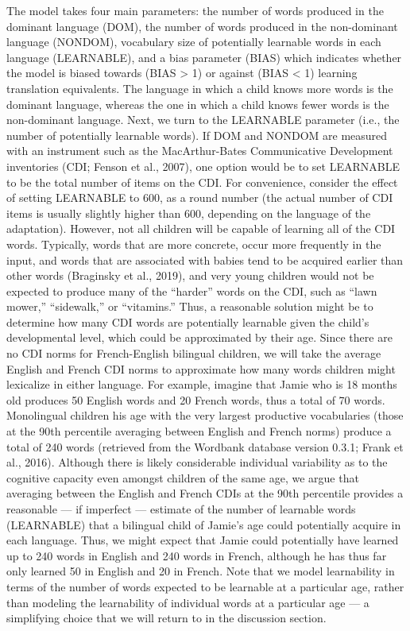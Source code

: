 \documentclass[
  english,
  ,man,floatsintext]{apa6}
\begin{document}
The model takes four main parameters: the number of words produced in the dominant language (DOM), the number of words produced in the non-dominant language (NONDOM), vocabulary size of potentially learnable words in each language (LEARNABLE), and a bias parameter (BIAS) which indicates whether the model is biased towards (BIAS \textgreater{} 1) or against (BIAS \textless{} 1) learning translation equivalents. The language in which a child knows more words is the dominant language, whereas the one in which a child knows fewer words is the non-dominant language. Next, we turn to the LEARNABLE parameter (i.e., the number of potentially learnable words). If DOM and NONDOM are measured with an instrument such as the MacArthur-Bates Communicative Development inventories (CDI; Fenson et al., 2007), one option would be to set LEARNABLE to be the total number of items on the CDI. For convenience, consider the effect of setting LEARNABLE to 600, as a round number (the actual number of CDI items is usually slightly higher than 600, depending on the language of the adaptation). However, not all children will be capable of learning all of the CDI words. Typically, words that are more concrete, occur more frequently in the input, and words that are associated with babies tend to be acquired earlier than other words (Braginsky et al., 2019), and very young children would not be expected to produce many of the ``harder'' words on the CDI, such as ``lawn mower,'' ``sidewalk,'' or ``vitamins.'' Thus, a reasonable solution might be to determine how many CDI words are potentially learnable given the child's developmental level, which could be approximated by their age. Since there are no CDI norms for French-English bilingual children, we will take the average English and French CDI norms to approximate how many words children might lexicalize in either language. For example, imagine that Jamie who is 18 months old produces 50 English words and 20 French words, thus a total of 70 words. Monolingual children his age with the very largest productive vocabularies (those at the 90th percentile averaging between English and French norms) produce a total of 240 words (retrieved from the Wordbank database version 0.3.1; Frank et al., 2016). Although there is likely considerable individual variability as to the cognitive capacity even amongst children of the same age, we argue that averaging between the English and French CDIs at the 90th percentile provides a reasonable --- if imperfect --- estimate of the number of learnable words (LEARNABLE) that a bilingual child of Jamie's age could potentially acquire in each language. Thus, we might expect that Jamie could potentially have learned up to 240 words in English and 240 words in French, although he has thus far only learned 50 in English and 20 in French. Note that we model learnability in terms of the number of words expected to be learnable at a particular age, rather than modeling the learnability of individual words at a particular age --- a simplifying choice that we will return to in the discussion section.
\end{document}
